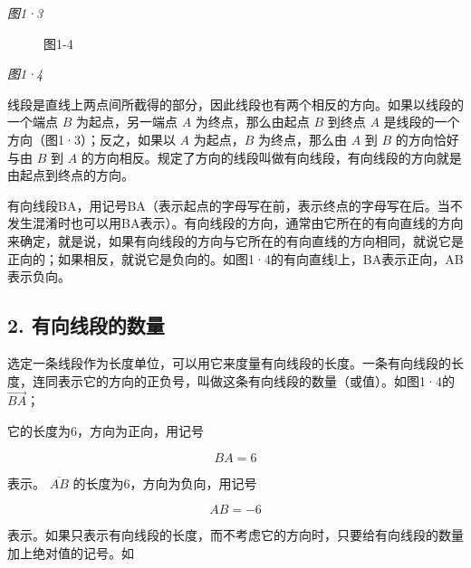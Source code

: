 \emph{图1·3}

\begin{figure}
\centering
{}
\caption{图1-4}
\end{figure}

\emph{图1·4}

线段是直线上两点间所截得的部分，因此线段也有两个相反的方向。如果以线段的一个端点
\(B\) 为起点，另一端点 \(A\) 为终点，那么由起点 \(B\) 到终点 \(A\)
是线段的一个方向（图1·3）；反之，如果以 \(A\) 为起点，\(B\)
为终点，那么由 \(A\) 到 \(B\) 的方向恰好与由 \(B\) 到 \(A\)
的方向相反。规定了方向的线段叫做有向线段，有向线段的方向就是由起点到终点的方向。

有向线段BA，用记号BA（表示起点的字母写在前，表示终点的字母写在后。当不发生混淆时也可以用BA表示）。有向线段的方向，通常由它所在的有向直线的方向来确定，就是说，如果有向线段的方向与它所在的有向直线的方向相同，就说它是正向的；如果相反，就说它是负向的。如图1·4的有向直线l上，BA表示正向，AB表示负向。

\subsection{2.
有向线段的数量}\label{ux6709ux5411ux7ebfux6bb5ux7684ux6570ux91cf}

选定一条线段作为长度单位，可以用它来度量有向线段的长度。一条有向线段的长度，连同表示它的方向的正负号，叫做这条有向线段的数量（或值）。如图1·4的
\(\overrightarrow{BA}\)；

它的长度为6，方向为正向，用记号

\[
BA = 6
\]

表示。 \(\overline{AB}\) 的长度为6，方向为负向，用记号

\[
AB = - 6
\]

表示。如果只表示有向线段的长度，而不考虑它的方向时，只要给有向线段的数量加上绝对值的记号。如

